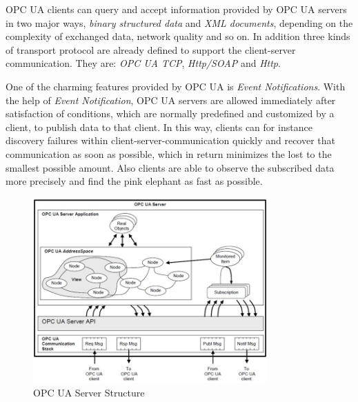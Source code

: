 OPC UA clients can query and accept information provided by OPC UA servers in two major ways, \emph{binary structured data} and \emph{XML documents}, depending on the complexity of exchanged data, network quality and so on. In addition three kinds of transport protocol are already defined to support the client-server communication. They are: \emph{OPC UA TCP}, \emph{Http/SOAP} and \emph{Http}.    

One of the charming features provided by OPC UA is \emph{Event Notifications}. With the help of \emph{Event Notification}, OPC UA servers are allowed immediately after satisfaction of conditions, which are normally predefined and customized by a client, to publish data to that client. In this way, clients can for instance discovery failures within client-server-communication quickly and recover that communication as soon as possible, which in return minimizes the lost to the smallest possible amount. Also clients are able to observe the subscribed data more precisely and find the pink elephant as fast as possible.


\begin{figure}[!htb]
	\centering
	\includegraphics[width=0.8\textwidth]{server.jpg}
		\caption{OPC UA Server Structure \cite{O1}}
	\label{fig:server}
\end{figure}


